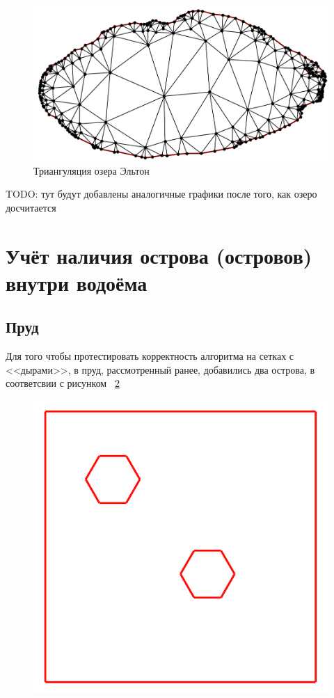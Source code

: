 \documentclass[14pt]{extreport}
\begin{document}
\begin{figure}[H]
\centerline{
\includegraphics[width=1.0\linewidth]{images/ex2/mesh}}
\caption{Триангуляция озера Эльтон}
\label{img:ex2:mesh}
\end{figure}

TODO: тут будут добавлены аналогичные графики после того, как озеро досчитается


\section{Учёт наличия острова (островов) внутри водоёма}


\subsection{Пруд}
Для того чтобы протестировать корректность алгоритма на сетках с <<дырами>>, в пруд, рассмотренный ранее, добавились два острова, в соответсвии с рисунком ~\ref{img:ex3:contour}

\begin{figure}[H]
\centerline{
\includegraphics[width=0.5\linewidth]{images/ex3/contour}}
\caption{}
\label{img:ex3:contour}
\end{figure}
\end{document}
